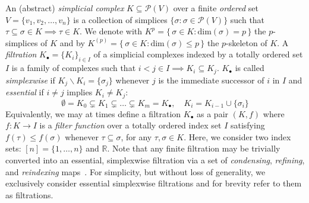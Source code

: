 An (abstract) \emph{simplicial complex} $K \subseteq \mathcal{P}(V)$ over a finite \emph{ordered} set $V = \{v_1, v_2, \dots, v_n \}$ is a collection of simplices $\{\sigma : \sigma \in \mathcal{P}(V) \}$ such that $\tau \subseteq \sigma \in K \implies \tau \in K$.
We denote with $K^p = \{ \, \sigma \in K : \mathrm{dim}(\sigma) = p \, \}$ the $p$-simplices of $K$ and by $K^{(p)} = \{ \, \sigma \in K : \mathrm{dim}(\sigma) \leq p \, \}$ the $p$-skeleton of $K$. 
A \emph{filtration} $K_\bullet = \{K_i\}_{i\in I}$ of a simplicial complexes indexed by a totally ordered set $I$ is a family of complexes such that $i< j \in I \implies K_i \subseteq K_j$. $K_\bullet$ is called \emph{simplexwise} if $K_j \smallsetminus K_i = \{\sigma_j\}$ whenever $j$ is the immediate successor of $i$ in $I$ and \emph{essential} if $i \neq j$ implies $K_i \neq K_j$:
\begin{equation}
	\emptyset = K_0 \subsetneq K_1 \subsetneq \dots \subsetneq K_m  = K_\bullet, \quad K_i  = K_{i-1} \cup \{\sigma_i\}
\end{equation} 
Equivalently, we may at times define a filtration $K_\bullet$ as a pair $(K, f)$ where $f : K \to I$ is a \emph{filter function} over a totally ordered index set $I$ satisfying $f(\tau) \leq f(\sigma)$ whenever $\tau \subseteq \sigma$, for any $\tau,\sigma \in K$. Here, we consider two index sets: $[n] = \{ 1, \dots, n\}$ and $\mathbb{R}$. 
Note that any finite filtration may be trivially converted into an essential, simplexwise filtration via a set of \emph{condensing}, \emph{refining}, and \emph{reindexing} maps~\cite{bauer2021ripser}. For simplicity, but without loss of generality, we exclusively consider essential simplexwise filtrations and for brevity refer to them as filtrations.
